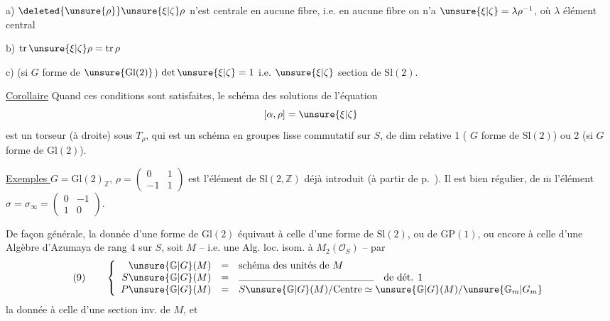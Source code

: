 a) $\deleted{\unsure{\rho}}\unsure{\xi|\zeta}\rho$ n'est centrale en aucune fibre, i.e. en aucune fibre on n'a $\unsure{\xi|\zeta}=\lambda\rho^{-1}$, où $\lambda$  élément central

b) $\mathrm{tr}\,\unsure{\xi|\zeta}\rho=\mathrm{tr}\,\rho$

c) (si $G$ forme de $\unsure{\mathrm{Gl}(2)}$) $\det\unsure{\xi|\zeta}=1$ i.e. $\unsure{\xi|\zeta}$ section de $\mathrm{Sl}(2)$.


\uline{Corollaire} Quand ces conditions sont satisfaites, le schéma des solutions  de l'équation
\[
[\alpha,\rho]=\unsure{\xi|\zeta}
\]
est un torseur (à droite) sous $T_\rho$, qui est un schéma en groupes lisse commutatif sur $S$, de dim relative 1 ( $G$ forme de $\mathrm{Sl}(2)$) ou 2 (si $G$ forme de $\mathrm{Gl}(2)$).

\uline{Exemples } $G=\mathrm{Gl}(2)_{\mathbb Z}$, $\rho=\begin{pmatrix}0&1\\-1&1\end{pmatrix}$ est l'élément de $\mathrm{Sl}(2,\mathbb Z)$ déjà introduit (à partir de p.~). Il est bien régulier,  de $\overline{\mathrm m}$ l'élément $\sigma=\sigma_\infty=\begin{pmatrix}0&-1\\1&0\end{pmatrix}$.

De façon générale, la donnée d'une forme de $\mathrm{Gl}(2)$ équivaut à celle d'une forme de $\mathrm{Sl}(2)$, ou de $\mathrm{GP}(1)$, ou encore à celle d'une Algèbre d'Azumaya de rang 4 sur $S$, soit $M$ -- i.e. une Alg. loc.  isom. à $M_2(\mathcal O_S)$ -- par
\[
(9)\qquad
\left\{
\begin{array}{rcl}
\unsure{\mathbb G|G}(M)&=&\text{schéma des unités de }M\\
S\unsure{\mathbb G|G}(M)&=&\rule{4.8cm}{0.3pt}\quad\text{de dét. }1\\
P\unsure{\mathbb G|G}(M)&=&S\unsure{\mathbb G|G}(M)/\mathrm{Centre}\simeq\unsure{\mathbb G|G}(M)/\unsure{\mathbb G_m|G_m}
\end{array}
\right.
\]
 la donnée   à celle d'une section inv. de $M$, et

